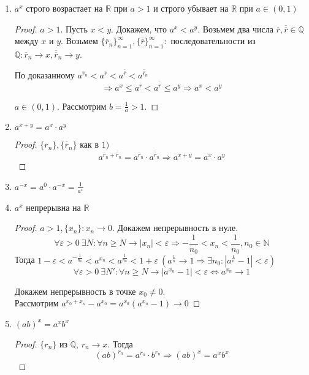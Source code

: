 \documentclass[12pt]{article}
\newenvironment{MyList}[1][4pt]{
  \begin{enumerate}[1.]
  \setlength{\parskip}{0pt}
  \setlength{\itemsep}{#1}
}{       
  \end{enumerate}
}
\def\Q{\mathbb{Q}}       %
\def\N{\mathbb{N}}       %
\def\R{\mathbb{R}}       %
\def\SO{\Rightarrow}     %
\def\EQ{\Leftrightarrow} %
\theoremstyle{definition} %
\theoremstyle{plain} %
\theoremstyle{remark} %
\begin{document}
\begin{MyList}
    \item $a^x$ строго возрастает на $\R$ при $a > 1$ и строго убывает на $\R$ при $a \in (0, 1)$
    \begin{proof}
        $a > 1$. Пусть $x < y$. Докажем, что $a^x < a^y$. Возьмем два числа $\overline{r}, \overline{\overline{r}} \in \Q$ между $x$ и $y$.
        Возьмем $\{\overline{r}_n\}_{n = 1}^\infty, \{\overline{\overline{r}}\}_{n = 1}^\infty :$ последовательности из $\Q : \overline{r}_n \to x, \overline{\overline{r}}_n \to y$.
        
        По доказанному $a^{\overline{r}_n} < a^{\overline{r}} < a^{\overline{\overline{r}}} < a^{\overline{\overline{r}}_n}$
        \[\SO a^x \leqslant a^{\overline{r}} < a^{\overline{\overline{r}}} \leqslant a^y \SO a^x < a^y\]
        
        $a \in (0, 1)$. Рассмотрим $b = \frac{1}{a} > 1$.  
    \end{proof}
    \item $a^{x + y} = a^x \cdot a^y$
    \begin{proof}
        $\{\overline{r}_n\}, \{\overline{\overline{r}}_n\}$ как в $1)$
        \[a^{\overline{r}_n + \overline{\overline{r}}_n} = a^{\overline{r}_n} \cdot a^{\overline{\overline{r}}_n} \SO a^{x + y} = a^x \cdot a^y\]
    \end{proof}
    \item $a^{-x} = a^0 \cdot a^{-x} = \frac{1}{a^x}$ 
    \item $a^x$ непрерывна на $\R$ 
    \begin{proof}
        $a > 1, \{x_n\}: x_n \to 0$. Докажем непрерывность в нуле.
        \[\forall \varepsilon > 0 \ \exists N : \forall n \geqslant N \to |x_n| < \varepsilon \SO -\frac{1}{n_0} < x_n < \frac{1}{n_0}, n_0 \in \N\]
        Тогда $1 - \varepsilon < a^{-\frac{1}{n_0}} < a^{x_n} < a^{\frac{1}{n_0}} < 1 + \varepsilon \ (a^{\frac{1}{n}} \to 1 \SO \exists n_0 : |a^{\frac{1}{n}} - 1| < \varepsilon)$
        \[\forall \varepsilon > 0 \ \exists N' : \forall n \geqslant N \to |a^{x_n} - 1| < \varepsilon \EQ a^{x_n} \to 1\]

        Докажем непрерывность в точке $x_0 \neq 0$. \\
        Рассмотрим $a^{x_0 + x_n} - a^{x_0} = a^{x_0} (a^{x_n} - 1) \to 0$  
    \end{proof}
    
    \item $(ab)^x = a^x b^x$
    \begin{proof}
        $\{r_n\}$ из $\Q$, $r_n \to x$. Тогда
        \[(ab)^{r_n} = a^{r_n} \cdot b^{r_n} \SO (ab)^x = a^x b^x\] 
    \end{proof}


\end{MyList}
\end{document}
